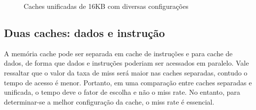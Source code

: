 \documentclass[12pt,a4paper]{article}
\begin{document}
\begin{figure}[h!]
\caption{Caches unificadas de 16KB com diversas configurações}
\end{figure}



\subsection{Duas caches:  dados e  instrução}
A memória cache pode ser separada em cache de instruções e para cache de dados,
de forma que dados e instruções poderiam ser acessados em paralelo. 
Vale ressaltar que o valor da taxa de miss será maior nas caches
separadas, contudo o tempo de acesso é menor.
Portanto, em uma comparação entre caches separadas e unificada, o tempo deve o fator de
escolha e não o miss rate. 
No entanto, para determinar-se a melhor configuração da cache, o miss
rate é essencial.
\end{document}
